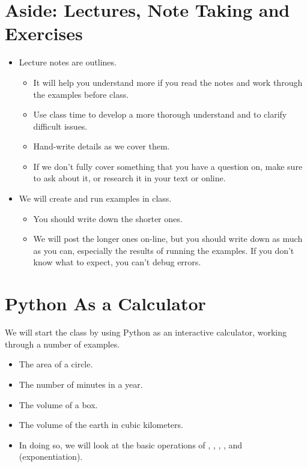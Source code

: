 \documentclass[letterpaper,10pt,english]{sphinxmanual}
\begin{document}
\section{Aside: Lectures, Note Taking and Exercises}
\label{\detokenize{lecture_notes/lec02_calculator:aside-lectures-note-taking-and-exercises}}\begin{itemize}
\item {} 
Lecture notes are outlines.
\begin{itemize}
\item {} 
It will help you understand more if you read the notes and work through
the examples before class.

\item {} 
Use class time to develop a more thorough
understand and to clarify difficult issues.

\item {} 
Hand-write details as we cover them.

\item {} 
If we don’t fully cover something that you have a question on, make
sure to ask about it, or research it in your text or online.

\end{itemize}

\item {} 
We will create and run examples in class.
\begin{itemize}
\item {} 
You should write down the shorter ones.

\item {} 
We will post the longer ones on-line, but you should write down as
much as you can, especially the results of running the
examples. If you don’t know what to expect, you can’t debug errors.

\end{itemize}

\end{itemize}


\section{Python As a Calculator}
\label{\detokenize{lecture_notes/lec02_calculator:python-as-a-calculator}}
We will start the class by using Python as an interactive calculator,
working through a number of examples.
\begin{itemize}
\item {} 
The area of a circle.

\item {} 
The number of minutes in a year.

\item {} 
The volume of a box.

\item {} 
The volume of the earth in cubic kilometers.

\item {} 
In doing so, we will look at the basic operations of \sphinxcode{\sphinxupquote{+}}, \sphinxcode{\sphinxupquote{-}}, \sphinxcode{\sphinxupquote{*}}, \sphinxcode{\sphinxupquote{/}},
and \sphinxcode{\sphinxupquote{**}} (exponentiation).

\end{itemize}
\end{document}
